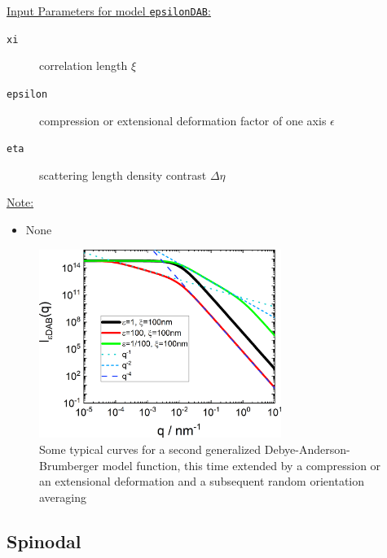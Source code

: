 \vspace{5mm}


\underline{Input Parameters for model \texttt{epsilonDAB}:}
\begin{description}
\item[\texttt{xi}] correlation length $\xi$
\item[\texttt{epsilon}] compression or extensional deformation factor of one axis $\epsilon$
\item[\texttt{eta}] scattering length density contrast $\Delta\eta$
\end{description}

\underline{Note:}
\begin{itemize}
\item None
\end{itemize}


\begin{figure}[htb]
\begin{center}
\includegraphics[width=0.7\textwidth]{../images/form_factor/nonparticular/epsilonDAB.png}
\end{center}
\caption{Some typical curves for a second generalized Debye-Anderson-Brumberger model function, this time extended by a compression or an extensional deformation and a subsequent random orientation averaging } \label{fig:spsilonDABIq}
\end{figure}

\clearpage
\subsection{Spinodal}
\label{sect:Spinodal}
~\\

